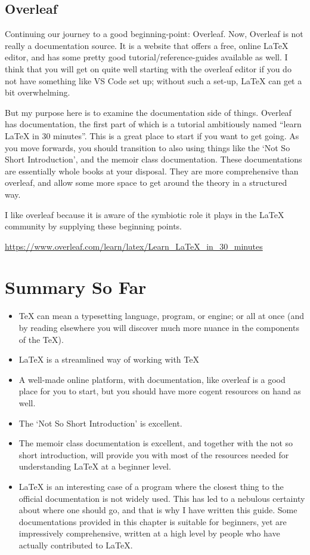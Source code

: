 \documentclass[11pt, oneside]{memoir}
\begin{document}
\subsection{Overleaf}

Continuing our journey to a good beginning-point: Overleaf. Now, Overleaf is not really a documentation source. It is a website that offers a free, online LaTeX editor, and has some pretty good tutorial/reference-guides available as well. I think that you will get on quite well starting with the overleaf editor if you do not have something like VS Code set up; without such a set-up, LaTeX can get a bit overwhelming.

But my purpose here is to examine the documentation side of things. Overleaf has documentation, the first part of which is a tutorial ambitiously named ``learn LaTeX in 30 minutes''. This is a great place to start if you want to get going. As you move forwards, you should transition to also using things like the `Not So Short Introduction', and the memoir class documentation. These documentations are essentially whole books at your disposal. They are more comprehensive than overleaf, and allow some more space to get around the theory in a structured way.

I like overleaf because it is aware of the symbiotic role it plays in the LaTeX community by supplying these beginning points.

\url{https://www.overleaf.com/learn/latex/Learn_LaTeX_in_30_minutes}

\section{Summary So Far}
\begin{itemize}
\item \TeX{} can mean a typesetting language, program, or engine; or all at once (and by reading elsewhere you will discover much more nuance in the components of the \TeX{}).
\item \LaTeX{} is a streamlined way of working with \TeX{} 
\item A well-made online platform, with documentation, like overleaf is a good place for you to start, but you should have more cogent resources on hand as well.
\item The `Not So Short Introduction' is excellent.
\item The memoir class documentation is excellent, and together with the not so short introduction, will provide you with most of the resources needed for understanding \LaTeX{} at a beginner level.
\item \LaTeX{} is an interesting case of a program where the closest thing to the official documentation is not widely used. This has led to a nebulous certainty about where one should go, and that is why I have written this guide. Some documentations provided in this chapter is suitable for beginners, yet are impressively comprehensive, written at a high level by people who have actually contributed to LaTeX.
\end{itemize}
\end{document}
